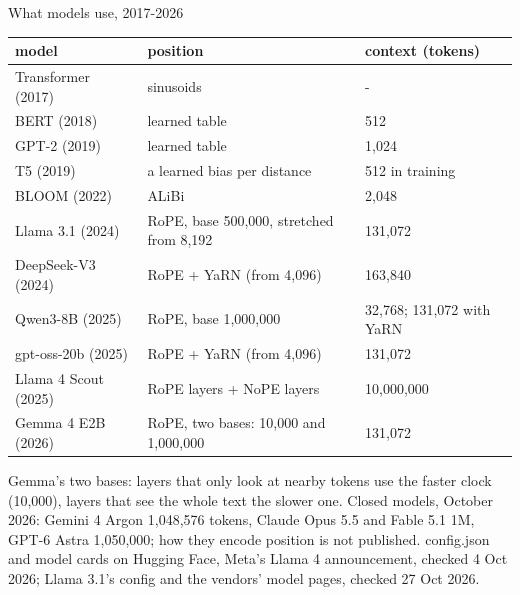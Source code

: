 \documentclass[aspectratio=169]{beamer}
\newcommand{\src}[1]{{\scriptsize\color{gray} #1}}
\begin{document}
\begin{frame}{What models use, 2017-2026}
  \footnotesize
  \begin{center}
  \begin{tabular}{lll}
    \textbf{model} & \textbf{position} & \textbf{context (tokens)} \\
    \hline
    Transformer (2017) & sinusoids & - \\
    BERT (2018) & learned table & 512 \\
    GPT-2 (2019) & learned table & 1,024 \\
    T5 (2019) & a learned bias per distance & 512 in training \\
    BLOOM (2022) & ALiBi & 2,048 \\
    Llama 3.1 (2024) & RoPE, base 500,000, stretched from 8,192 & 131,072 \\
    DeepSeek-V3 (2024) & RoPE + YaRN (from 4,096) & 163,840 \\
    Qwen3-8B (2025) & RoPE, base 1,000,000 & 32,768; 131,072 with YaRN \\
    gpt-oss-20b (2025) & RoPE + YaRN (from 4,096) & 131,072 \\
    Llama 4 Scout (2025) & RoPE layers + NoPE layers & 10,000,000 \\
    Gemma 4 E2B (2026) & RoPE, two bases: 10,000 and 1,000,000 & 131,072 \\
  \end{tabular}
  \end{center}
  \vskip 4pt
  {\small Gemma's two bases: layers that only look at nearby tokens use the faster clock
  (10,000), layers that see the whole text the slower one. Closed models, October 2026: Gemini 4
  Argon 1,048,576 tokens, Claude Opus 5.5 and Fable 5.1 1M, GPT-6 Astra 1,050,000; how they encode
  position is not published.}
  \vskip 2pt
  \src{config.json and model cards on Hugging Face, Meta's Llama 4 announcement, checked 4 Oct
  2026; Llama 3.1's config and the vendors' model pages, checked 27 Oct 2026.}
\end{frame}
\end{document}
